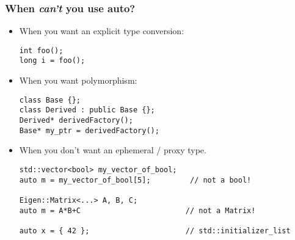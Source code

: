 \begin{frame}[fragile]
\frametitle{When \emph{can't} you use auto?}

\begin{itemize} %
\item When you want an explicit type conversion:
{\scriptsize
\begin{verbatim}
int foo();
long i = foo();
\end{verbatim}
}
\vskip 6pt

\item When you want polymorphism:
{\scriptsize
\begin{verbatim}
class Base {};
class Derived : public Base {};
Derived* derivedFactory();
Base* my_ptr = derivedFactory();
\end{verbatim} }
\vskip 6pt
\item When you don't want an ephemeral / proxy type.
{\scriptsize
\begin{verbatim}
std::vector<bool> my_vector_of_bool;
auto m = my_vector_of_bool[5];         // not a bool!

Eigen::Matrix<...> A, B, C;
auto m = A*B+C                        // not a Matrix!

auto x = { 42 };                      // std::initializer_list

\end{verbatim}
}
\vskip 6pt


\end{itemize} %
\end{frame}





